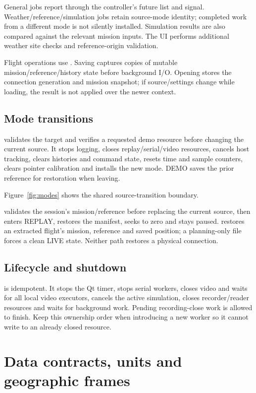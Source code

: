 General jobs report through the controller's future list and 
signal. Weather/reference/simulation jobs retain source-mode identity; completed
work from a different mode is not silently installed. Simulation results are
also compared against the relevant mission inputs. The UI performs additional
weather site checks and reference-origin validation.

Flight operations use . Saving captures copies of mutable
mission/reference/history state before background I/O. Opening stores the
connection generation and mission snapshot; if source/settings change while
loading, the result is not applied over the newer context.

\subsection{Mode transitions}
 validates the target and verifies a requested demo resource
before changing the current source. It stops logging, closes replay/serial/video
resources, cancels host tracking, clears histories and command state, resets time
and sample counters, clears pointer calibration and installs the new mode.
DEMO saves the prior reference for restoration when leaving.

Figure~\ref{fig:modes} shows the shared source-transition boundary.

 validates the session's mission/reference before replacing
the current source, then enters REPLAY, restores the manifest, seeks to zero and
stays paused.  restores an extracted flight's mission,
reference and saved position; a planning-only file forces a clean LIVE state.
Neither path restores a physical connection.

\subsection{Lifecycle and shutdown}
 is idempotent. It stops the Qt timer, stops serial
workers, closes video and waits for all local video executors, cancels the active
simulation, closes recorder/reader resources and waits for background work.
Pending recording-close work is allowed to finish. Keep this ownership order
when introducing a new worker so it cannot write to an already closed resource.



\section{Data contracts, units and geographic frames}\label{sec:data}
